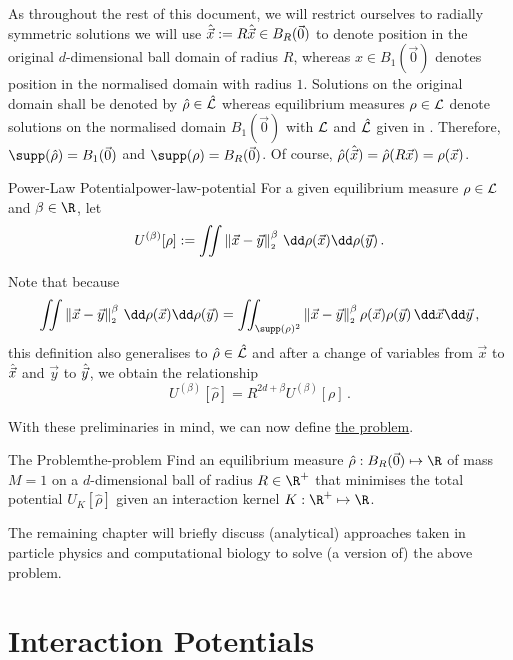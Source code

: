 As throughout the rest of this document, we will restrict ourselves to radially symmetric solutions we will use $\hat{\vec{x}} := R\hat{\vec{x}} \in B_R(\vec{0})$ to denote position in the original $d$-dimensional ball domain of radius $R$, whereas $x \in B_1(\vec{0})$ denotes position in the normalised domain with radius $1$.
Solutions on the original domain shall be denoted by $\hat{\rho} \in \hat{\mathcal{L}}$ whereas equilibrium measures $\rho \in \mathcal{L}$ denote solutions on the normalised domain $B_1(\vec{0})$ with $\mathcal{L}$ and $\hat{\mathcal{L}}$ given in .
Therefore, $\supp(\hat{\rho}) = B_1(\vec{0})$ and $\supp(\rho) = B_R(\vec{0})$.
Of course, $\hat{\rho}(\hat{\vec{x}}) = \hat{\rho}(R\vec{x}) = \rho(\vec{x})$.


\begin{definition}{Power-Law Potential}{power-law-potential}
  For a given equilibrium measure $\rho \in \mathcal{L}$ and $\beta \in \R$, let
  $$U^{(\beta)}[\rho] := \iint \norm{\vec{x}-\vec{y}}^\beta \,\dd\rho(\vec{x})\dd\rho(\vec{y})\,.$$
\end{definition}

Note that because
$$\iint \norm{\vec{x}-\vec{y}}^\beta \,\dd\rho(\vec{x})\dd\rho(\vec{y}) = \iint_{\supp(\rho)^2} \norm{\vec{x}-\vec{y}}^\beta \rho(\vec{x}) \rho(\vec{y}) \,\dd\vec{x}\dd\vec{y}\,,$$
this definition also generalises to $\hat{\rho} \in \hat{\mathcal{L}}$ and after a change of variables from $\vec{x}$ to $\hat{\vec{x}}$ and $\vec{y}$ to $\hat{\vec{y}}$, we obtain the relationship
$$U^{(\beta)}[\hat{\rho}] = R^{2d + \beta} U^{(\beta)}[\rho]\,.$$

With these preliminaries in mind, we can now define \href{def:the-problem}{the problem}.

\begin{definition}[colframe=gray, colbacktitle=gray!30]{The Problem}{the-problem}
  Find an equilibrium measure $\hat{\rho}: B_R(\vec{0}) \mapsto \R$ of mass $M = 1$ on a $d$-dimensional ball of radius $R \in \R^+$ that minimises the total potential $U_K[\hat{\rho}]$ given an interaction kernel $K: \R^+ \mapsto \R$.
\end{definition}

The remaining chapter will briefly discuss (analytical) approaches taken in particle physics and computational biology to solve (a version of) the above problem.

\section{Interaction Potentials}
